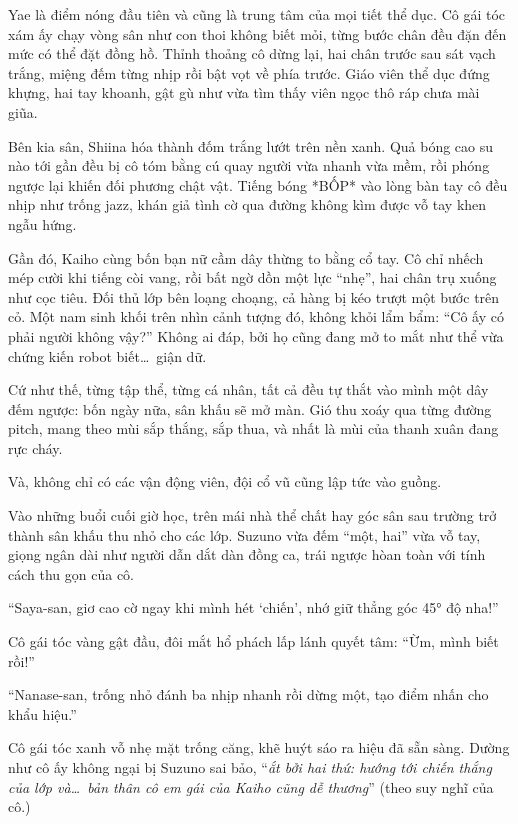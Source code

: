 \documentclass[../main.tex]{subfiles}
\begin{document}
Yae là điểm nóng đầu tiên và cũng là trung tâm của mọi tiết thể dục. Cô gái tóc xám ấy chạy vòng sân như con thoi không biết mỏi, từng bước chân đều đặn đến mức có thể đặt đồng hồ. Thỉnh thoảng cô dừng lại, hai chân trước sau sát vạch trắng, miệng đếm từng nhịp rồi bật vọt về phía trước. Giáo viên thể dục đứng khựng, hai tay khoanh, gật gù như vừa tìm thấy viên ngọc thô ráp chưa mài giũa.

Bên kia sân, Shiina hóa thành đốm trắng lướt trên nền xanh. Quả bóng cao su nào tới gần đều bị cô tóm bằng cú quay người vừa nhanh vừa mềm, rồi phóng ngược lại khiến đối phương chật vật. Tiếng bóng *BỐP* vào lòng bàn tay cô đều nhịp như trống jazz, khán giả tình cờ qua đường không kìm được vỗ tay khen ngẫu hứng.

Gần đó, Kaiho cùng bốn bạn nữ cầm dây thừng to bằng cổ tay. Cô chỉ nhếch mép cười khi tiếng còi vang, rồi bất ngờ dồn một lực ``nhẹ'', hai chân trụ xuống như cọc tiêu. Đối thủ lớp bên loạng choạng, cả hàng bị kéo trượt một bước trên cỏ. Một nam sinh khối trên nhìn cảnh tượng đó, không khỏi lẩm bẩm: ``Cô ấy có phải người không vậy?'' Không ai đáp, bởi họ cũng đang mở to mắt như thể vừa chứng kiến robot biết\dots\ giận dữ.

Cứ như thế, từng tập thể, từng cá nhân, tất cả đều tự thắt vào mình một dây đếm ngược: bốn ngày nữa, sân khấu sẽ mở màn. Gió thu xoáy qua từng đường pitch, mang theo mùi sắp thắng, sắp thua, và nhất là mùi của thanh xuân đang rực cháy.

Và, không chỉ có các vận động viên, đội cổ vũ cũng lập tức vào guồng.

Vào những buổi cuối giờ học, trên mái nhà thể chất hay góc sân sau trường trở thành sân khấu thu nhỏ cho các lớp. Suzuno vừa đếm ``một, hai'' vừa vỗ tay, giọng ngân dài như người dẫn dắt dàn đồng ca, trái ngược hòan toàn với tính cách thu gọn của cô.

``Saya-san, giơ cao cờ ngay khi mình hét `chiến', nhớ giữ thẳng góc 45° độ nha!''

Cô gái tóc vàng gật đầu, đôi mắt hổ phách lấp lánh quyết tâm: ``Ừm, mình biết rồi!''

``Nanase-san, trống nhỏ đánh ba nhịp nhanh rồi dừng một, tạo điểm nhấn cho khẩu hiệu.''

Cô gái tóc xanh vỗ nhẹ mặt trống căng, khẽ huýt sáo ra hiệu đã sẵn sàng. Dường như cô ấy không ngại bị Suzuno sai bảo, ``\textit{ắt bởi hai thứ: hướng tới chiến thắng của lớp và\dots\ bản thân cô em gái của Kaiho cũng dễ thương}'' (theo suy nghĩ của cô.)
\end{document}
